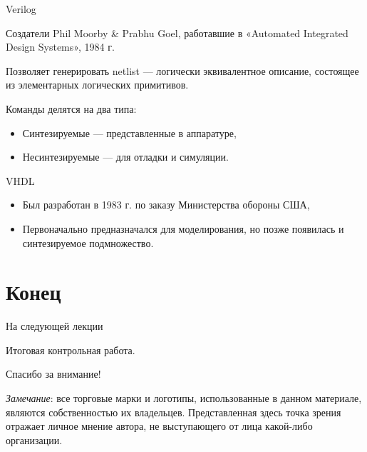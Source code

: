 \begin{frame}{Verilog}

Создатели Phil Moorby \& Prabhu Goel, работавшие в «Automated Integrated Design Systems», 1984 г.

Позволяет генерировать netlist --- логически эквивалентное описание, состоящее из элементарных логических примитивов.

Команды делятся на два типа:

\begin{itemize}
    \item Синтезируемые --- представленные в аппаратуре,
    \item Несинтезируемые --- для отладки и симуляции.
\end{itemize}

\end{frame}

\begin{frame}{VHDL}

\begin{itemize}
    \item Был разработан в 1983 г. по заказу Министерства обороны США,
    \item Первоначально предназначался для моделирования, но позже появилась и синтезируемое подмножество.
\end{itemize}

\end{frame}


\section*{Конец}

\begin{frame}{На следующей лекции}

Итоговая контрольная работа.

\end{frame}

\begin{frame}

{\huge{Спасибо за внимание!}\par}

\vfill

\tiny{\textit{Замечание}: все торговые марки и логотипы, использованные в данном материале, являются собственностью их владельцев. Представленная здесь точка зрения отражает личное мнение автора, не выступающего от лица какой-либо организации.}

\end{frame}



